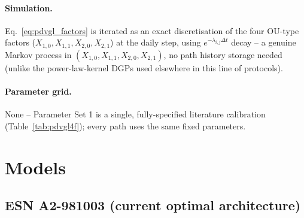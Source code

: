 \documentclass[11pt,a4paper]{article}
\begin{document}
\paragraph{Simulation.}
Eq.~\eqref{eq:pdvgl_factors} is iterated as an exact discretisation of
the four OU-type factors ($X_{1,0},X_{1,1},X_{2,0},X_{2,1}$) at the
daily step, using $e^{-\lambda_{i,j}\Delta t}$ decay -- a genuine Markov
process in $(X_{1,0},X_{1,1},X_{2,0},X_{2,1})$, no path history storage
needed (unlike the power-law-kernel DGPs used elsewhere in this line of
protocols).

\paragraph{Parameter grid.}
None -- Parameter Set 1 is a single, fully-specified literature
calibration (Table~\ref{tab:pdvgl4f}); every path uses the same fixed
parameters.

\section{Models}
\subsection{ESN A2-981003 (current optimal architecture)}
\end{document}
